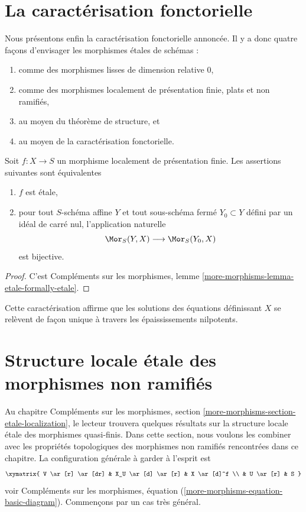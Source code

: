 \section{La caractérisation fonctorielle}
\label{section-functorial-etale}

\noindent
Nous présentons enfin la caractérisation fonctorielle annoncée.
Il y a donc quatre façons d'envisager les morphismes \'etales de schémas :
\begin{enumerate}
\item comme des morphismes lisses de dimension relative $0$,
\item comme des morphismes localement de présentation finie, plats et non ramifiés,
\item au moyen du théorème de structure, et
\item au moyen de la caractérisation fonctorielle.
\end{enumerate}

\begin{theorem}
\label{theorem-formally-etale}
Soit $f : X \to S$ un morphisme localement de présentation finie.
Les assertions suivantes sont équivalentes
\begin{enumerate}
\item $f$ est \'etale,
\item pour tout $S$-schéma affine $Y$ et tout sous-schéma fermé $Y_0 \subset Y$
défini par un idéal de carré nul, l'application naturelle
$$
\Mor_S(Y, X) \longrightarrow \Mor_S(Y_0, X)
$$
est bijective.
\end{enumerate}
\end{theorem}

\begin{proof}
C'est
Compléments sur les morphismes, lemme \ref{more-morphisms-lemma-etale-formally-etale}.
\end{proof}

\noindent
Cette caractérisation affirme que les solutions des équations définissant $X$ se
relèvent de façon unique à travers les épaississements nilpotents.



\section{Structure locale \'etale des morphismes non ramifiés}
\label{section-unramified-etale-local}

\noindent
Au chapitre
Compléments sur les morphismes, section \ref{more-morphisms-section-etale-localization},
le lecteur trouvera quelques résultats sur la structure locale \'etale des
morphismes quasi-finis. Dans cette section, nous voulons les combiner
avec les propriétés topologiques des morphismes non ramifiés rencontrées
dans ce chapitre. La configuration générale à garder à l'esprit est
$$
\xymatrix{
V \ar[r] \ar[dr] & X_U \ar[d] \ar[r] & X \ar[d]^f \\
& U \ar[r] & S
}
$$
voir
Compléments sur les morphismes, équation (\ref{more-morphisms-equation-basic-diagram}).
Commençons par un cas très général.

